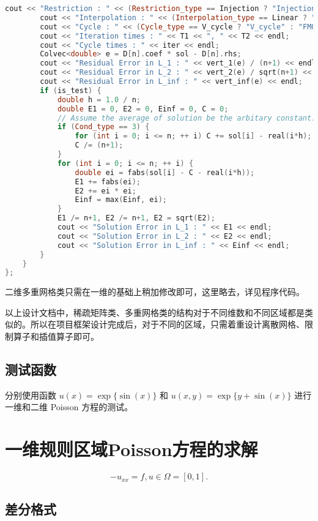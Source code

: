 \documentclass{ctexart}
\begin{document}
\begin{lstlisting}[language=c++]
		cout << "Restriction : " << (Restriction_type == Injection ? "Injection" : "Full Weighting") << endl;
		cout << "Interpolation : " << (Interpolation_type == Linear ? "Linear" : "Quadratic") << endl;
		cout << "Cycle : " << (Cycle_type == V_cycle ? "V_cycle" : "FMG") << endl;
		cout << "Iteration times : " << T1 << ", " << T2 << endl;
		cout << "Cycle times : " << iter << endl;
		Colvec<double> e = D[n].coef * sol - D[n].rhs;
		cout << "Residual Error in L_1 : " << vert_1(e) / (n+1) << endl;
		cout << "Residual Error in L_2 : " << vert_2(e) / sqrt(n+1) << endl;
		cout << "Residual Error in L_inf : " << vert_inf(e) << endl;
		if (is_test) {
			double h = 1.0 / n;
			double E1 = 0, E2 = 0, Einf = 0, C = 0;
			// Assume the average of solution be the arbitary constant.
			if (Cond_type == 3) {
				for (int i = 0; i <= n; ++ i) C += sol[i] - real(i*h);
				C /= (n+1);
			}
			for (int i = 0; i <= n; ++ i) {
				double ei = fabs(sol[i] - C - real(i*h));
				E1 += fabs(ei);
				E2 += ei * ei;
				Einf = max(Einf, ei);
			}
			E1 /= n+1, E2 /= n+1, E2 = sqrt(E2);
			cout << "Solution Error in L_1 : " << E1 << endl;
			cout << "Solution Error in L_2 : " << E2 << endl;
			cout << "Solution Error in L_inf : " << Einf << endl;
		}
	}
};
\end{lstlisting}

二维多重网格类只需在一维的基础上稍加修改即可，这里略去，详见程序代码。

以上设计文档中，稀疏矩阵类、多重网格类的结构对于不同维数和不同区域都是类似的。所以在项目框架设计完成后，对于不同的区域，只需着重设计离散网格、限制算子和插值算子即可。

\subsection{测试函数}

分别使用函数 $u(x) = \exp\{\sin(x)\}$ 和 $u(x,y) = \exp\{y+\sin(x)\}$ 进行一维和二维 Poisson 方程的测试。

\section{一维规则区域Poisson方程的求解}

\begin{equation}
	-u_{xx} = f,u\in \Omega = [0,1].
\end{equation}

\subsection{差分格式}
\end{document}
